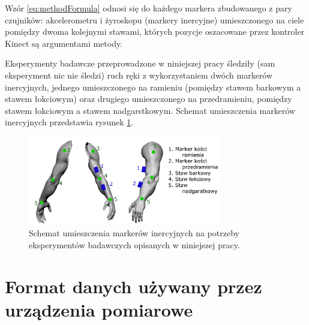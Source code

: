 Wzór \eqref{eq:methodFormula} odnosi się do każdego markera zbudowanego z pary czujników: akcelerometru i żyroskopu (markery inercyjne) umieszczonego na ciele pomiędzy dwoma kolejnymi stawami, których pozycje oszacowane przez kontroler Kinect są argumentami metody. 

Eksperymenty badawcze przeprowadzone w niniejszej pracy śledziły (sam eksperyment nic nie śledzi) ruch ręki z wykorzystaniem dwóch markerów inercyjnych, jednego umieszczonego na ramieniu (pomiędzy stawem barkowym a stawem łokciowym) oraz drugiego umieszczonego na przedramieniu, pomiędzy stawem łokciowym a stawem nadgarstkowym. Schemat umieszczenia markerów inercyjnych przedstawia rysunek \ref{fig:hybrid:imuMarkerPlacementSample}.
\begin{figure}[!htp]
	\centering	
	\includegraphics[width=0.75\textwidth]{images/imuArm.png}
	\caption{Schemat umieszczenia markerów inercyjnych na potrzeby eksperymentów badawczych opisanych w niniejszej pracy.}
	\label{fig:hybrid:imuMarkerPlacementSample}
\end{figure}

\section{Format danych używany przez urządzenia pomiarowe}
